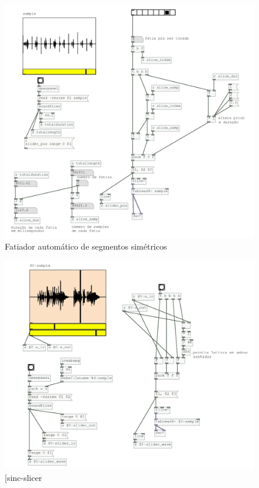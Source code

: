 \documentclass[draft]{ppgmus}
\begin{document}
\begin{figure}
\includegraphics[scale=.6]{slicer3}
\caption{Fatiador automático de segmentos simétricos}
\label{slicer3}
\end{figure}

\begin{figure}
\includegraphics[scale=.6]{sinc-slicer}
\caption{[sinc-slicer}
\label{sinc-slicer}
\end{figure}
\end{document}
